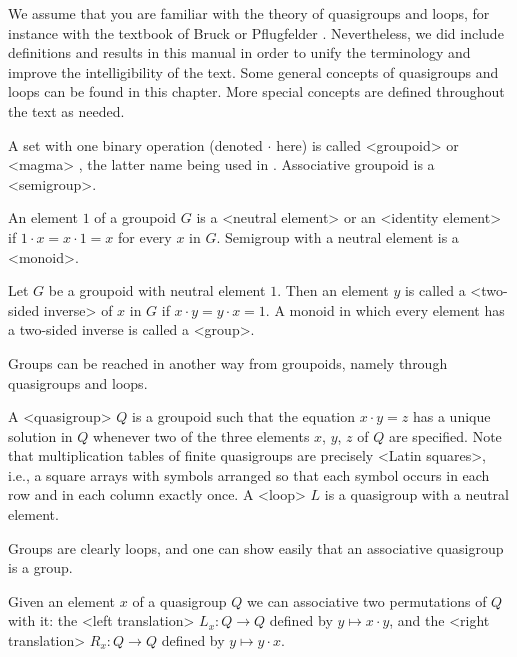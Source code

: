 
We assume that you are familiar with the theory of quasigroups and loops, for
instance with the textbook of Bruck \cite{Br} or Pflugfelder \cite{Pf}.
Nevertheless, we did include definitions and results in this manual in order to
unify the terminology and improve the intelligibility of the text. Some general
concepts of quasigroups and loops can be found in this chapter. More special
concepts are defined throughout the text as needed.


A set with one binary operation (denoted $\cdot$ here) is called
<groupoid> or <magma> , the latter name being used
in {\GAP}. Associative groupoid is a <semigroup>.

An element $1$ of a groupoid $G$ is a <neutral element>
or an <identity element> if $1\cdot x = x\cdot 1 = x$
for every $x$ in $G$. Semigroup with a neutral element is a
<monoid>.

Let $G$ be a groupoid with neutral element $1$. Then an element $y$ is called a
<two-sided inverse> of $x$ in $G$ if $x\cdot y =
y\cdot x = 1$. A monoid in which every element has a two-sided inverse is
called a <group>.

Groups can be reached in another way from groupoids, namely through quasigroups
and loops.

A <quasigroup> $Q$ is a groupoid such that the equation
$x\cdot y=z$ has a unique solution in $Q$ whenever two of the three elements
$x$, $y$, $z$ of $Q$ are specified. Note that multiplication tables of finite
quasigroups are precisely <Latin squares>, i.e., a square
arrays with symbols arranged so that each symbol occurs in each row and in each
column exactly once. A <loop> $L$ is a quasigroup with a neutral
element.

Groups are clearly loops, and one can show easily that an associative
quasigroup is a group.


Given an element $x$ of a quasigroup $Q$ we can associative two permutations of
$Q$ with it: the <left translation> $L_x:Q\to Q$
defined by $y\mapsto x\cdot y$, and the <right translation> $R_x:Q\to Q$ defined by $y\mapsto y\cdot x$.

